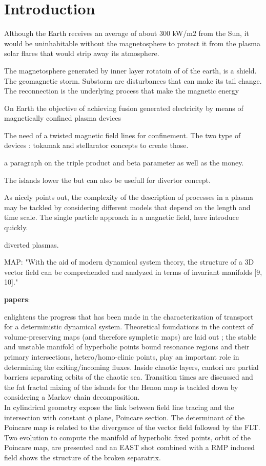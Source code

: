 
\cleardoublepage
\chapter*{Introduction}

Although the Earth receives an average of about 300 kW/m2 from the Sun, it would be uninhabitable without the magnetosphere to protect it from the plasma solar flares that would strip away its atmosphere. 

The magnetosphere generated by inner layer rotatoin of of the earth, is a shield. The geomagnetic storm. Substorm are disturbances that can make its tail change. The reconnection is the underlying process that make the magnetic energy 

On Earth the objective of achieving fusion generated electricity by means of magnetically confined plasma devices 

The need of a twisted magnetic field lines for confinement. The two type of devices : tokamak and stellarator concepts to create those.

a paragraph on the triple product and beta parameter as well as the money.

The islands lower the but can also be usefull for divertor concept.

As \cite{imbert-gerard_introduction_2020} nicely points out, the complexity of the description of processes in a plasma may be tackled by considering different models that depend on the length and time scale. The single particle approach in a magnetic field, here introduce quickly.

diverted plasmas.

MAP: "With the aid of modern dynamical system theory, the structure of a 3D vector field can be comprehended and analyzed in terms of invariant manifolds [9, 10]."

\textbf{papers}:

\cite{meiss_thirty_2015} enlightens the progress that has been made in the characterization of transport for a deterministic dynamical system. Theoretical foundations in the context of volume-preserving maps (and therefore sympletic maps) are laid out ; the stable and unstable manifold of hyperbolic points bound resonance regions and their primary intersections, hetero/homo-clinic points, play an important role in determining the exiting/incoming fluxes. Inside chaotic layers, cantori are partial barriers separating orbits of the chaotic sea. Transition times are discussed and the fat fractal mixing of the islands for the Henon map is tackled down by considering a Markov chain decomposition.
\\[10pt]
In cylindrical geometry \cite{wei_invariant_2023} expose the link between field line tracing and the intersection with constant $\phi$ plane, Poincare section. The determinant of the Poincare map is related to the divergence of the vector field followed by the FLT. Two evolution to compute the manifold of hyperbolic fixed points, orbit of the Poincare map, are presented and an EAST shot combined with a RMP induced field shows the structure of the broken separatrix.


